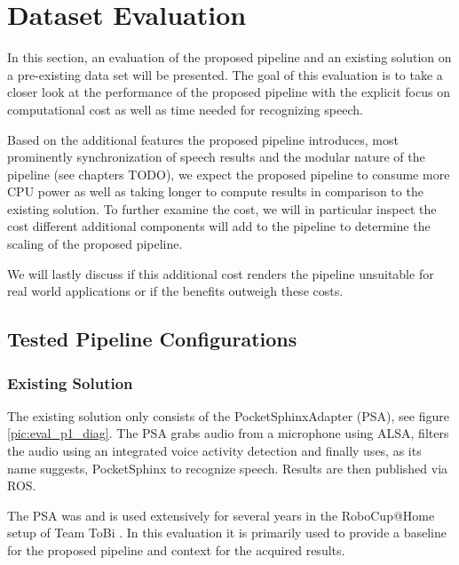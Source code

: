 

\section{Dataset Evaluation}
\label{eval:dataset}

In this section, an evaluation of the proposed pipeline and an existing solution on a pre-existing data set will be presented.
The goal of this evaluation is to take a closer look at the performance of the proposed pipeline with the explicit focus on computational cost as well as time needed for recognizing speech.

Based on the additional features the proposed pipeline introduces, most prominently synchronization of speech results and the modular nature of the pipeline (see chapters TODO), we expect the proposed pipeline to consume more CPU power as well as taking longer to compute results in comparison to the existing solution.
To further examine the cost, we will in particular inspect the cost different additional components will add to the pipeline to determine the scaling of the proposed pipeline.

We will lastly discuss if this additional cost renders the pipeline unsuitable for real world applications or if the benefits outweigh these costs.


\subsection{Tested Pipeline Configurations}

\subsubsection{Existing Solution}

The existing solution only consists of the PocketSphinxAdapter (PSA), see figure \ref{pic:eval_p1_diag}.
The PSA grabs audio from a microphone using ALSA, filters the audio using an integrated voice activity detection and finally uses, as its name suggests, PocketSphinx to recognize speech.
Results are then published via ROS.

The PSA was and is used extensively for several years in the RoboCup@Home setup of Team ToBi \cite{ToBi}.
In this evaluation it is primarily used to provide a baseline for the proposed pipeline and context for the acquired results.

